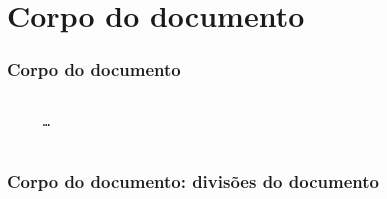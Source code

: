 \section{Corpo do documento}

\begin{frame}[fragile]
  \frametitle{Corpo do documento}
  \begin{verbatim}
    
     …
    
  \end{verbatim}
\end{frame}

\begin{frame}[fragile]
  \frametitle{Corpo do documento: divisões do documento}
  \large
  \begin{multicols}{2}
  \end{multicols}
\end{frame}

